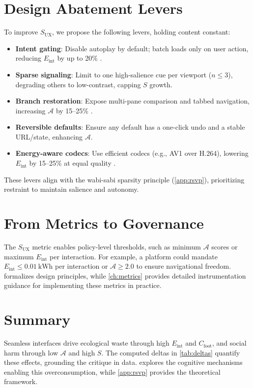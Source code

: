 \documentclass[openany]{book}
\newcommand{\Sent}{S} %
\newcommand{\Eint}{E_{\mathrm{int}}} %
\newcommand{\Cfoot}{C_{\mathrm{foot}}} %
\newcommand{\Auton}{\mathcal{A}} %
\newcommand{\SUX}{S_{\mathrm{UX}}} %
\newcommand{\kWh}{\mathrm{kWh}}
\begin{document}
\section{Design Abatement Levers}
\label{sec:abatement}
To improve $\SUX$, we propose the following levers, holding content constant:
\begin{itemize}
  \item \textbf{Intent gating}: Disable autoplay by default; batch loads only on user action, reducing $\Eint$ by up to 20\% \citep{extentia2024}.
  \item \textbf{Sparse signaling}: Limit to one high-salience cue per viewport ($n \leq 3$), degrading others to low-contrast, capping $\Sent$ growth.
  \item \textbf{Branch restoration}: Expose multi-pane comparison and tabbed navigation, increasing $\Auton$ by 15–25\% \citep{doctorow2022}.
  \item \textbf{Reversible defaults}: Ensure any default has a one-click undo and a stable URL/state, enhancing $\Auton$.
  \item \textbf{Energy-aware codecs}: Use efficient codecs (e.g., AV1 over H.264), lowering $\Eint$ by 15–25\% at equal quality \citep{extentia2024}.
\end{itemize}
These levers align with the wabi-sabi sparsity principle (\cref{app:rsvp}), prioritizing restraint to maintain salience and autonomy.

\section{From Metrics to Governance}
\label{sec:governance-preview}
The $\SUX$ metric enables policy-level thresholds, such as minimum $\Auton$ scores or maximum $\Eint$ per interaction. For example, a platform could mandate $\Eint \leq \SI{0.01}{\kWh}$ per interaction or $\Auton \geq 2.0$ to ensure navigational freedom.  formalizes design principles, while \cref{ch:metrics} provides detailed instrumentation guidance for implementing these metrics in practice.

\section{Summary}
Seamless interfaces drive ecological waste through high $\Eint$ and $\Cfoot$, and social harm through low $\Auton$ and high $\Sent$. The computed deltas in \cref{tab:deltas} quantify these effects, grounding the critique in data.  explores the cognitive mechanisms enabling this overconsumption, while \cref{app:rsvp} provides the theoretical framework.
\end{document}
